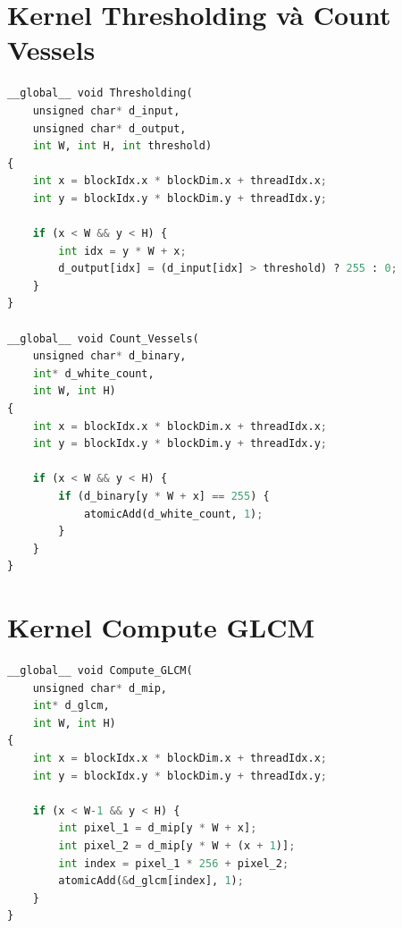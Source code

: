 
\section{Kernel Thresholding và Count Vessels}

\begin{lstlisting}[language=Python, label={lst:detect_function}]
__global__ void Thresholding(
    unsigned char* d_input, 
    unsigned char* d_output,
    int W, int H, int threshold) 
{
    int x = blockIdx.x * blockDim.x + threadIdx.x;
    int y = blockIdx.y * blockDim.y + threadIdx.y;
    
    if (x < W && y < H) {
        int idx = y * W + x;
        d_output[idx] = (d_input[idx] > threshold) ? 255 : 0;
    }
}

__global__ void Count_Vessels(
    unsigned char* d_binary, 
    int* d_white_count,
    int W, int H) 
{
    int x = blockIdx.x * blockDim.x + threadIdx.x;
    int y = blockIdx.y * blockDim.y + threadIdx.y;
    
    if (x < W && y < H) {
        if (d_binary[y * W + x] == 255) {
            atomicAdd(d_white_count, 1);
        }
    }
}
\end{lstlisting}


\section{Kernel Compute GLCM}

\begin{lstlisting}[language=Python, label={lst:detect_function}]
__global__ void Compute_GLCM(
    unsigned char* d_mip, 
    int* d_glcm,
    int W, int H) 
{
    int x = blockIdx.x * blockDim.x + threadIdx.x;
    int y = blockIdx.y * blockDim.y + threadIdx.y;
    
    if (x < W-1 && y < H) {
        int pixel_1 = d_mip[y * W + x];
        int pixel_2 = d_mip[y * W + (x + 1)];
        int index = pixel_1 * 256 + pixel_2;
        atomicAdd(&d_glcm[index], 1);
    }
}
\end{lstlisting}
